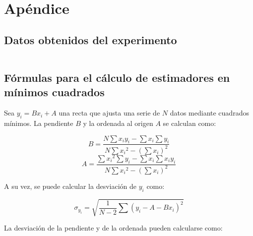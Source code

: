 \section{Apéndice}
\label{sec:apendice}


\subsection{Datos obtenidos del experimento}

\begin{table}[H]
    \footnotesize
    \centering
    \begin{tabular}{r|rrrr}\toprule
        
    \end{tabular}
\end{table}

\subsection{Fórmulas para el cálculo de estimadores en mínimos cuadrados}
\label{sec:apendice:formulas-estimadores-mc}

Sea $y_i = Bx_i + A$ una recta que ajusta una serie de $N$ datos mediante
cuadrados mínimos. La pendiente $B$ y la ordenada al origen $A$ se calculan
como:

\newcommand{\denominador}{N \sum {x_i}^2 - \left( \sum x_i \right)^2} 

\begin{equation}
    \label{ec:apendice:pendiente-mc}
    B = \frac{ N \sum x_i y_i - \sum x_i \sum y_i }
             { \denominador }
\end{equation}
\vspace{5mm}
\begin{equation}
    \label{ec:apendice:ordenada-mc}
    A = \frac{ \sum {x_i}^2 \sum y_i - \sum x_i \sum x_i y_i}
             { \denominador }
\end{equation}
\vspace{5mm}

A su vez, se puede calcular la desviación de $y_i$ como:

\begin{equation}
    \label{ec:apendice:desviacion-y-mc}
    \sigma_{y_i} = \sqrt{ \frac{1}{N-2} \sum 
                          \left( y_i - A - B x_i \right)^2 }
\end{equation}

\vspace{5mm}
La desviación de la pendiente y de la ordenada pueden calcularse como:

